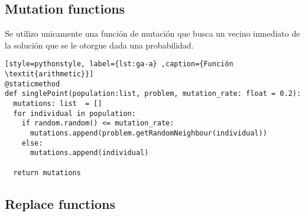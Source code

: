 \subsection{Mutation functions}

Se utilizo unicamente una función de mutación que busca un vecino inmediato de la solución que se le otorgue dada una probabilidad.

\begin{lstlisting}[style=pythonstyle, label={lst:ga-a} ,caption={Función  \textit{arithmetic}}]
@staticmethod
def singlePoint(population:list, problem, mutation_rate: float = 0.2):
  mutations: list  = []
  for individual in population:
    if random.random() <= mutation_rate:
      mutations.append(problem.getRandomNeighbour(individual))
    else:
      mutations.append(individual)

  return mutations
\end{lstlisting}

\subsection{Replace functions}



